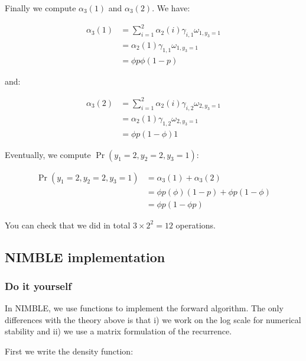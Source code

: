 \documentclass[
  12pt,
]{krantz}
\begin{document}
Finally we compute \(\alpha_3(1)\) and \(\alpha_3(2)\). We have:

\begin{align*}
\alpha_3(1) &= \sum_{i=1}^2 \alpha_2(i) \gamma_{i,1} \omega_{1,y_3=1}\\
            &= \alpha_2(1) \gamma_{1,1} \omega_{1,y_3=1}\\
            &= \phi p \phi (1-p)
\end{align*}

and:

\begin{align*}
\alpha_3(2) &= \sum_{i=1}^2 \alpha_2(i) \gamma_{i,2} \omega_{2,y_3=1}\\
            &= \alpha_2(1) \gamma_{1,2} \omega_{2,y_3=1}\\
            &= \phi p (1-\phi) 1
\end{align*}

Eventually, we compute \(\Pr(y_1=2,y_2=2,y_3=1)\):

\begin{align*}
\Pr(y_1=2,y_2=2,y_3=1) &= \alpha_3(1) + \alpha_3(2)\\
            &= \phi p (\phi) (1-p) + \phi p (1-\phi)\\
            &= \phi p (1-\phi p)
\end{align*}

You can check that we did in total \(3 \times 2^2 = 12\) operations.

\subsection{NIMBLE implementation}\label{nimblemarginalization}

\subsubsection{Do it yourself}\label{diymarginalisation}

In NIMBLE, we use functions to implement the forward algorithm. The only differences with the theory above is that i) we work on the log scale for numerical stability and ii) we use a matrix formulation of the recurrence.

First we write the density function:
\end{document}
